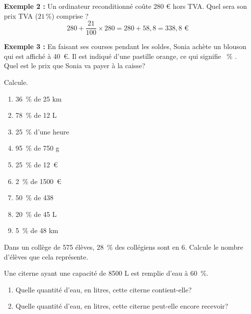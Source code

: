 \documentclass[../../syllabus_1.tex]{subfiles}
\begin{document}
\textbf{Exemple 2 :} Un ordinateur reconditionné coûte $280$ € hors TVA. Quel sera son prix TVA ($21\,\%$) comprise ?
\begin{equation*}
    280 + \frac{21}{100} \times 280 = 280 + 58{,}8 = 338{,}8 \text{ €}
\end{equation*}

\textbf{Exemple 3 :} En faisant ses courses pendant les soldes, Sonia achète un blouson qui est affiché à 40~€. Il est indiqué d'une pastille orange, ce qui signifie ~\% \fg. Quel est le prix que Sonia va payer à la caisse?
\vspace{3cm}

\begin{exercise}
    Calcule.
    \begin{enumerate}[cols=3, itemsep=2cm]
        \item 36~\% de 25 km
        \item 78~\% de 12 L
        \item 25~\% d'une heure
        \item 95~\% de 750 g
        \item 25~\% de 12~€
        \item 2~\% de \num{1500}~€
        \item 50~\% de 438
        \item 20~\% de 45 L
        \item 5~\% de 48 km
    \end{enumerate}
    \vspace{2cm}
\end{exercise}

\begin{exercise}
    Dans un collège de 575 élèves, 28~\% des collégiens sont en 6\ieme. Calcule le nombre d'élèves que cela représente.
    \vspace{3cm}
\end{exercise}

\begin{exercise}
    Une citerne ayant une capacité de \num{8500} L est remplie d'eau à 60~\%.
    \begin{enumerate}[itemsep=2cm]
        \item Quelle quantité d'eau, en litres, cette citerne contient-elle?
        \item Quelle quantité d'eau, en litres, cette citerne peut-elle encore recevoir?
    \end{enumerate}
    \vspace{2cm}
\end{exercise}
\end{document}
